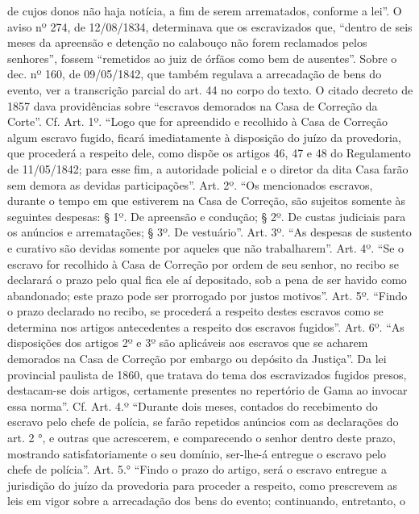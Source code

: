 {{  de cujos donos não haja notícia, a fim de serem arrematados, conforme
  a lei''. O aviso nº 274, de 12/08/1834, determinava que os escravizados
  que, ``dentro de seis meses da apreensão e detenção no calabouço não
  forem reclamados pelos senhores'', fossem ``remetidos ao juiz de órfãos
  como bem de ausentes''. Sobre o dec. nº 160, de 09/05/1842, que também
  regulava a arrecadação de bens do evento, ver a transcrição parcial do
  art. 44 no corpo do texto. O citado decreto de 1857 dava providências
  sobre ``escravos demorados na Casa de Correção da Corte''. Cf. Art.
  1º. ``Logo que for apreendido e recolhido à Casa de Correção algum
  escravo fugido, ficará imediatamente à disposição do juízo da
  provedoria, que procederá a respeito dele, como dispõe os artigos 46,
  47 e 48 do Regulamento de 11/05/1842; para esse fim, a autoridade
  policial e o diretor da dita Casa farão sem demora as devidas
  participações''. Art. 2º. ``Os mencionados escravos, durante o tempo em
  que estiverem na Casa de Correção, são sujeitos somente às seguintes
  despesas: § 1º. De apreensão e condução; § 2º. De custas judiciais
  para os anúncios e arrematações; § 3º. De vestuário''. Art. 3º. ``As
  despesas de sustento e curativo são devidas somente por aqueles que
  não trabalharem''. Art. 4º. ``Se o escravo for recolhido à Casa de
  Correção por ordem de seu senhor, no recibo se declarará o prazo pelo
  qual fica ele aí depositado, sob a pena de ser havido como abandonado;
  este prazo pode ser prorrogado por justos motivos''. Art. 5º. ``Findo o
  prazo declarado no recibo, se procederá a respeito destes escravos
  como se determina nos artigos antecedentes a respeito dos escravos
  fugidos''. Art. 6º. ``As disposições dos artigos 2º e 3º são aplicáveis
  aos escravos que se acharem demorados na Casa de Correção por embargo
  ou depósito da Justiça''. Da lei provincial paulista de 1860, que
  tratava do tema dos escravizados fugidos presos, destacam-se dois
  artigos, certamente presentes no repertório de Gama ao invocar essa
  norma''. Cf. Art. 4.º ``Durante dois meses, contados do recebimento do
  escravo pelo chefe de polícia, se farão repetidos anúncios com as
  declarações do art. 2 °, e outras que acrescerem, e comparecendo o
  senhor dentro deste prazo, mostrando satisfatoriamente o seu domínio,
  ser-lhe-á entregue o escravo pelo chefe de polícia''. Art. 5.° ``Findo o
  prazo do artigo, será o escravo entregue a jurisdição do juízo da
  provedoria para proceder a respeito, como prescrevem as leis em vigor
  sobre a arrecadação dos bens do evento; continuando, entretanto, o
}}
